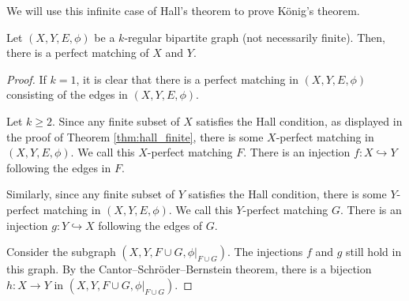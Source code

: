 We will use this infinite case of Hall's theorem to prove König's theorem. 
\begin{theorem}\label{thm:konig}
  Let $\left(X,Y,E,\phi\right)$ be a $k$-regular bipartite graph (not necessarily finite). Then, there is a perfect matching of $X$ and $Y$.
\end{theorem}
\begin{proof}
  If $k = 1$, it is clear that there is a perfect matching in $\left(X,Y,E,\phi\right)$ consisting of the edges in $\left(X,Y,E,\phi\right)$.\newline

  Let $k\geq 2$. Since any finite subset of $X$ satisfies the Hall condition, as displayed in the proof of Theorem \ref{thm:hall_finite}, there is some $X$-perfect matching in $\left(X,Y,E,\phi\right)$. We call this $X$-perfect matching $F$. There is an injection $f: X\hookrightarrow Y$ following the edges in $F$.\newline

  Similarly, since any finite subset of $Y$ satisfies the Hall condition, there is some $Y$-perfect matching in $\left(X,Y,E,\phi\right)$. We call this $Y$-perfect matching $G$. There is an injection $g: Y\hookrightarrow X$ following the edges of $G$.\newline

  Consider the subgraph $\left(X,Y,F\cup G,\phi|_{F\cup G}\right)$. The injections $f$ and $g$ still hold in this graph. By the Cantor--Schröder--Bernstein theorem, there is a bijection $h: X\rightarrow Y$ in $\left(X,Y,F\cup G,\phi|_{F\cup G}\right)$.
\end{proof}
